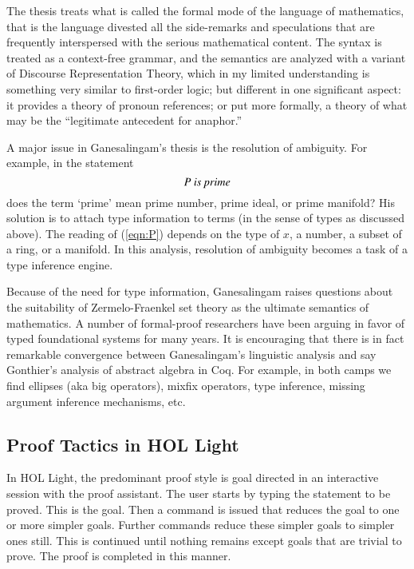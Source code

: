 \documentclass{llncs}
\begin{document}
The thesis treats what is called the formal mode of the language of
mathematics, that is the language divested all the side-remarks and
speculations that are frequently interspersed with the serious
mathematical content.  The syntax is treated as a context-free
grammar, and the semantics are analyzed with a variant of Discourse
Representation Theory, which  in my limited understanding is
something very similar to first-order logic; but different in one
significant aspect: it provides a theory of pronoun references; or put
more formally, a theory of what may be the ``legitimate antecedent for
anaphor.''

A major issue in Ganesalingam's thesis is the resolution of ambiguity.
For example, in the statement
\begin{equation}\label{eqn:P}
P \text{\it ~is prime}
\end{equation}
does the term `prime' mean prime number, prime ideal, or prime
manifold?  His solution is to attach type information to terms (in the
sense of types as discussed above).  The reading of (\ref{eqn:P})
depends on the type of $x$, a number, a subset of a ring, or a
manifold.  In this analysis, resolution of ambiguity becomes a task of
a type inference engine.  

Because of the need for type information, Ganesalingam raises
questions about the suitability of Zermelo-Fraenkel set theory as the
ultimate semantics of mathematics.  A number of formal-proof
researchers have been arguing in favor of typed foundational systems
for many years.  It is encouraging that there is in fact remarkable
convergence between Ganesalingam's linguistic analysis and say
Gonthier's analysis of abstract algebra in Coq. For example, in both
camps we find ellipses (aka big operators), mixfix operators, type
inference, missing argument inference mechanisms, etc.



\subsection{Proof Tactics in HOL Light}

In HOL Light, the predominant proof style is goal directed in an
interactive session with the proof assistant.  The user starts by
typing the statement to be proved.  This is the goal.  Then a command
is issued that reduces the goal to one or more simpler goals.  Further
commands reduce these simpler goals to simpler ones still.  This is
continued until nothing remains except goals that are trivial to
prove.  The proof is completed in this manner.
\end{document}
